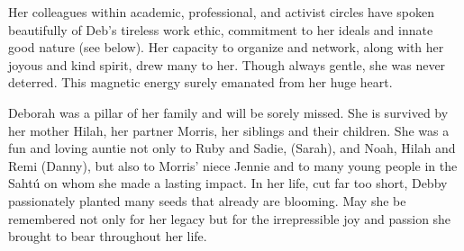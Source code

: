 \documentclass[12pt]{extarticle}
\begin{document}
Her colleagues within academic, professional, and activist circles have
spoken beautifully of Deb's tireless work ethic, commitment to her
ideals and innate good nature (see below). Her capacity to organize and
network, along with her joyous and kind spirit, drew many to her. Though
always gentle, she was never deterred. This magnetic energy surely
emanated from her huge heart.

Deborah was a pillar of her family and will be sorely missed. She is
survived by her mother Hilah, her partner Morris, her siblings and their
children. She was a fun and loving auntie not only to Ruby and Sadie,
(Sarah), and Noah, Hilah and Remi (Danny), but also to Morris' niece
Jennie and to many young people in the Sahtú on whom she made a lasting
impact. In her life, cut far too short, Debby passionately planted many
seeds that already are blooming. May she be remembered not only for her
legacy but for the irrepressible joy and passion she brought to bear
throughout her life.





\vspace*{\fill}


\vspace*{\fill}

\clearpage
{}
\vspace*{\fill}

\end{document}
